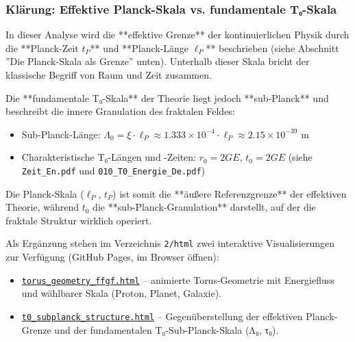 	\subsubsection{Klärung: Effektive Planck-Skala vs. fundamentale T₀-Skala}
	In dieser Analyse wird die **effektive Grenze** der kontinuierlichen Physik durch die **Planck-Zeit \( t_P \)** und **Planck-Länge \(\ell_P\)** beschrieben (siehe Abschnitt ''Die Planck-Skala als Grenze'' unten). Unterhalb dieser Skala bricht der klassische Begriff von Raum und Zeit zusammen.
	
	Die **fundamentale T₀-Skala** der Theorie liegt jedoch **sub-Planck** und beschreibt die innere Granulation des fraktalen Feldes:
	\begin{itemize}
		\item Sub-Planck-Länge: \(\Lambda_0 = \xi \cdot \ell_P \approx 1.333 \times 10^{-4} \cdot \ell_P \approx 2.15 \times 10^{-39} \) m
		\item Charakteristische T₀-Längen und -Zeiten: \( r_0 = 2GE \), \( t_0 = 2GE \) (siehe \texttt{Zeit\_En.pdf} und \texttt{010\_T0\_Energie\_De.pdf})
	\end{itemize}
	
	Die Planck-Skala (\(\ell_P\), \( t_P \)) ist somit die **äußere Referenzgrenze** der effektiven Theorie, während \( t_0 \) die **sub-Planck-Granulation** darstellt, auf der die fraktale Struktur wirklich operiert.
	
	Als Ergänzung stehen im Verzeichnis \texttt{2/html} zwei interaktive Visualisierungen zur Verfügung (GitHub Pages, im Browser öffnen):
	\begin{itemize}
		\item \href{https://jpascher.github.io/T0-Time-Mass-Duality/2/html/torus_geometry_ffgf.html}{\texttt{torus\_geometry\_ffgf.html}} – animierte Torus-Geometrie mit Energiefluss und wählbarer Skala (Proton, Planet, Galaxie).
		\item \href{https://jpascher.github.io/T0-Time-Mass-Duality/2/html/t0_subplanck_structure.html}{\texttt{t0\_subplanck\_structure.html}} – Gegenüberstellung der effektiven Planck-Grenze und der fundamentalen T₀-Sub-Planck-Skala (Λ₀, τ₀).
	\end{itemize}
	
